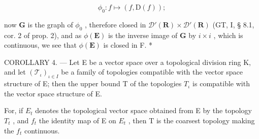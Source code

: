 \[
\phi_ {0}: f \mapsto (f, \mathrm{D} (f));
\]

now \(\mathbf{G}\) is the graph of \(\phi_0\) , therefore closed in \(\mathcal{D}'(\mathbf{R}) \times \mathcal{D}'(\mathbf{R})\) (GT, I, § 8.1, cor. 2 of prop. 2), and as \(\phi(\mathbf{E})\) is the inverse image of \(\mathbf{G}\) by \(i \times i\) , which is continuous, we see that \(\phi(\mathbf{E})\) is closed in F. *

COROLLARY 4. --- Let E be a vector space over a topological division ring K, and let \((\mathcal{T}_{\iota})_{\iota\in I}\) be a family of topologies compatible with the vector space structure of E; then the upper bound T of the topologies \(T_{\iota}\) is compatible with the vector space structure of E.

For, if \(E_{t}\) denotes the topological vector space obtained from E by the topology \(T_{t}\) , and \(f_{t}\) the identity map of E on \(E_{t}\) , then T is the coarsest topology making the \(f_{t}\) continuous.

